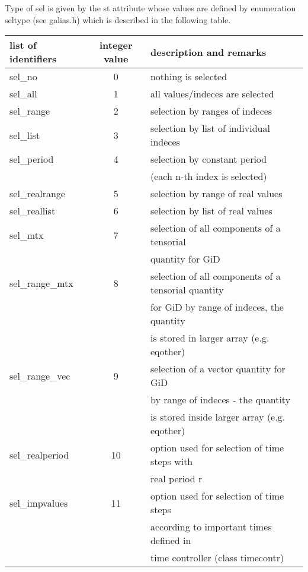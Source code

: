 Type of {\sf sel} is given by the {\sf st} attribute whose values are defined by 
enumeration {\sf seltype} (see {\sf galias.h}) which is described in the following table.

\begin{center}
\begin{tabular}{|l|c|l|}
\hline
list of identifiers & integer value & description and remarks
\\ \hline \hline
{\sf sel\_no}       &  0 &  nothing is selected
\\ \hline
{\sf sel\_all}      &  1 &  all values/indeces are selected
\\ \hline
{\sf sel\_range}     &  2 &  selection by ranges of indeces
\\ \hline
{\sf sel\_list}      &  3 &  selection by list of individual indeces
\\ \hline
{\sf sel\_period}     &  4 &  selection by constant period \\
                  &    &  (each n-th index is selected)          
\\ \hline
{\sf sel\_realrange}   &  5 &  selection by range of real values
\\ \hline
{\sf sel\_reallist}    &  6 &  selection by list of real values
\\ \hline
{\sf sel\_mtx}       &  7 &   selection of all components of a tensorial\\
                  &    &   quantity for GiD
\\ \hline
{\sf sel\_range\_mtx}  &  8 &   selection of all components of a tensorial quantity\\
                  &    &   for GiD by range of indeces, the quantity \\
                  &    &   is stored in larger array (e.g. {\sf eqother})
\\ \hline
{\sf sel\_range\_vec}  &  9 &   selection of a vector quantity for GiD\\
                  &    &   by range of indeces - the quantity \\
                  &    &   is stored inside larger array (e.g. {\sf eqother})
\\ \hline
{\sf sel\_realperiod}  &  10 &  option used for selection of time steps with \\
                  &     &  real period {\sf r}
\\ \hline
{\sf sel\_impvalues}   &  11 &  option used for selection of time steps \\
                  &      &  according to important times defined in \\
                  &      &  time controller (class {\sf timecontr})
\\ \hline
\end{tabular}
\end{center}

